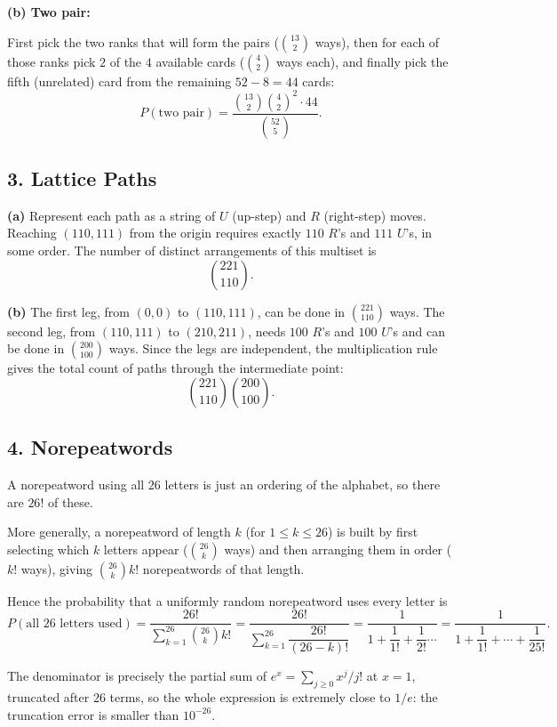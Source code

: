 \documentclass{article}
\begin{document}
\medskip
\textbf{(b) Two pair:}

First pick the two ranks that will form the pairs ($\binom{13}{2}$ ways), then for each of those ranks pick $2$ of the $4$ available cards ($\binom{4}{2}$ ways each), and finally pick the fifth (unrelated) card from the remaining $52-8=44$ cards:
$$P(\text{two pair}) = \frac{\binom{13}{2}\binom{4}{2}^2 \cdot 44}{\binom{52}{5}}.$$

\subsection*{3. Lattice Paths}

\textbf{(a)} Represent each path as a string of $U$ (up-step) and $R$ (right-step) moves. Reaching $(110,111)$ from the origin requires exactly $110$ $R$'s and $111$ $U$'s, in some order. The number of distinct arrangements of this multiset is
$$\binom{221}{110}.$$

\medskip
\textbf{(b)} The first leg, from $(0,0)$ to $(110,111)$, can be done in $\binom{221}{110}$ ways. The second leg, from $(110,111)$ to $(210,211)$, needs $100$ $R$'s and $100$ $U$'s and can be done in $\binom{200}{100}$ ways. Since the legs are independent, the multiplication rule gives the total count of paths through the intermediate point:
$$\binom{221}{110}\binom{200}{100}.$$

\subsection*{4. Norepeatwords}

A norepeatword using all $26$ letters is just an ordering of the alphabet, so there are $26!$ of these.

More generally, a norepeatword of length $k$ (for $1 \le k \le 26$) is built by first selecting which $k$ letters appear ($\binom{26}{k}$ ways) and then arranging them in order ($k!$ ways), giving $\binom{26}{k}k!$ norepeatwords of that length.

Hence the probability that a uniformly random norepeatword uses every letter is
$$
P(\text{all 26 letters used}) = \frac{26!}{\sum_{k=1}^{26}\binom{26}{k}k!}
= \frac{26!}{\sum_{k=1}^{26} \dfrac{26!}{(26-k)!}}
= \frac{1}{1 + \dfrac{1}{1!} + \dfrac{1}{2!} \cdots}
= \frac{1}{1 + \dfrac{1}{1!} + \cdots + \dfrac{1}{25!}}.
$$

The denominator is precisely the partial sum of $e^x = \sum_{j\ge 0} x^j/j!$ at $x=1$, truncated after $26$ terms, so the whole expression is extremely close to $1/e$: the truncation error is smaller than $10^{-26}$.
\end{document}
